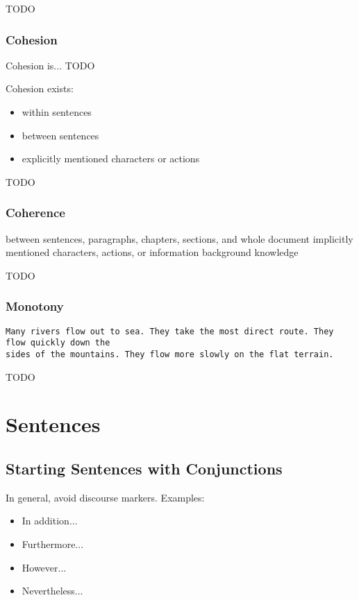 \documentclass[10pt,a4paper]{book}
\begin{document}
\color{BrickRed}TODO\color{black}


\subsection{Cohesion}

Cohesion is...
\color{BrickRed}TODO\color{black}

Cohesion exists:
\begin{itemize}
    \itemsep1pt\parskip0pt
    \item within sentences
    \item between sentences
    \item explicitly mentioned characters or actions
\end{itemize}

\color{BrickRed}TODO\color{black}


\subsection{Coherence}

between sentences, paragraphs, chapters, sections, and whole document
implicitly mentioned characters, actions, or information
background knowledge

\color{BrickRed}TODO\color{black}


\subsection{Monotony}

\begin{verbatim}
Many rivers flow out to sea. They take the most direct route. They flow quickly down the
sides of the mountains. They flow more slowly on the flat terrain.
\end{verbatim}

\color{BrickRed}TODO\color{black}


\chapter{Sentences}

\section{Starting Sentences with Conjunctions}

In general, avoid discourse markers. Examples:
\begin{itemize}
    \itemsep1pt\parskip0pt
    \item In addition...
    \item Furthermore...
    \item However...
    \item Nevertheless...
\end{itemize}
\end{document}
